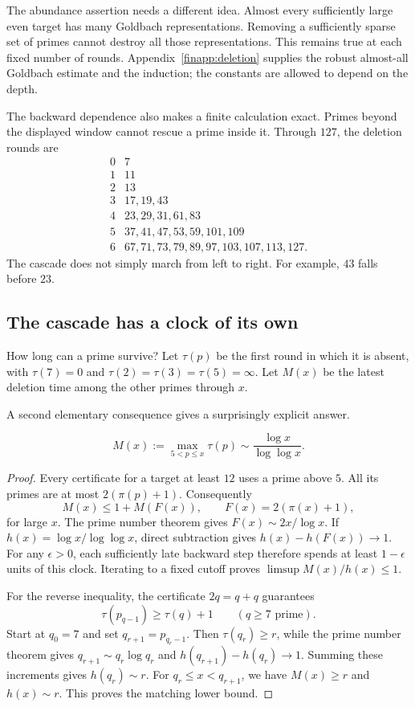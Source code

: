 The abundance assertion needs a different idea.
Almost every sufficiently large even target has many Goldbach
representations.  Removing a sufficiently sparse set of primes cannot
destroy all those representations.  This remains true at each fixed
number of rounds.  Appendix~\ref{finapp:deletion} supplies the robust
almost-all Goldbach estimate and the induction; the constants are
allowed to depend on the depth.

The backward dependence also makes a finite calculation exact.
Primes beyond the displayed window cannot rescue a prime inside it.
Through $127$, the deletion rounds are
\[
 \begin{array}{c|l}
 0&7\\
 1&11\\
 2&13\\
 3&17,19,43\\
 4&23,29,31,61,83\\
 5&37,41,47,53,59,101,109\\
 6&67,71,73,79,89,97,103,107,113,127.
 \end{array}
\]
The cascade does not simply march from left to right.
For example, $43$ falls before $23$.

\subsection{The cascade has a clock of its own}
How long can a prime survive?
Let $\tau(p)$ be the first round in which it is absent, with
$\tau(7)=0$ and $\tau(2)=\tau(3)=\tau(5)=\infty$.
Let $M(x)$ be the latest deletion time among the other primes through $x$.

A second elementary consequence gives a surprisingly explicit answer.
\begin{proposition}\label{fin:depthclock}
\[
 \boxed{M(x):=\max_{5<p\le x}\tau(p)
          \sim\frac{\log x}{\log\log x}.}
\]
\end{proposition}
\begin{proof}
Every certificate for a target at least $12$ uses a prime above $5$.
All its primes are at most $2(\pi(p)+1)$.
Consequently
\[
 M(x)\le1+M(F(x)),\qquad F(x)=2(\pi(x)+1),
\]
for large $x$.
The prime number theorem gives $F(x)\sim2x/\log x$.
If $h(x)=\log x/\log\log x$, direct subtraction gives
$h(x)-h(F(x))\to1$.
For any $\epsilon>0$, each sufficiently late backward step therefore
spends at least $1-\epsilon$ units of this clock.
Iterating to a fixed cutoff proves
$\limsup M(x)/h(x)\le1$.

For the reverse inequality, the certificate $2q=q+q$ guarantees
\[
 \tau(p_{q-1})\ge\tau(q)+1\qquad(q\ge7\text{ prime}).
\]
Start at $q_0=7$ and set $q_{r+1}=p_{q_r-1}$.
Then $\tau(q_r)\ge r$, while the prime number theorem gives
$q_{r+1}\sim q_r\log q_r$ and
$h(q_{r+1})-h(q_r)\to1$.  Summing these increments gives
$h(q_r)\sim r$.
For $q_r\le x<q_{r+1}$, we have $M(x)\ge r$ and $h(x)\sim r$.
This proves the matching lower bound.
\end{proof}

